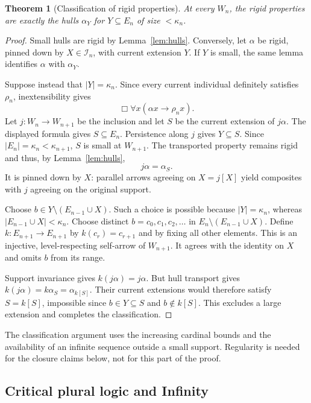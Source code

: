 \documentclass[11pt]{article}
\newtheorem{theorem}{Theorem}[section]
\theoremstyle{definition}
\numberwithin{equation}{section}
\begin{document}
\begin{theorem}[Classification of rigid properties]\label{thm:classification}
At every $W_n$, the rigid properties are exactly the hulls $\alpha_Y$ for $Y\subseteq E_n$ of size $<\kappa_n$.
\end{theorem}
\begin{proof}
Small hulls are rigid by Lemma~\ref{lem:hulls}. Conversely, let $\alpha$ be rigid, pinned down by $X\in\mathcal I_n$, with current extension $Y$. If $Y$ is small, the same lemma identifies $\alpha$ with $\alpha_Y$.

Suppose instead that $|Y|=\kappa_n$. Since every current individual definitely satisfies $\rho_n$, inextensibility gives
$$
\Box\forall x(\alpha x\rightarrow\rho_nx).
$$
Let $j:W_n\to W_{n+1}$ be the inclusion and let $S$ be the current extension of $j\alpha$. The displayed formula gives $S\subseteq E_n$. Persistence along $j$ gives $Y\subseteq S$. Since $|E_n|=\kappa_n<\kappa_{n+1}$, $S$ is small at $W_{n+1}$. The transported property remains rigid and thus, by Lemma~\ref{lem:hulls},
$$
j\alpha=\alpha_S.
$$
It is pinned down by $X$: parallel arrows agreeing on $X=j[X]$ yield composites with $j$ agreeing on the original support.

Choose $b\in Y\setminus(E_{n-1}\cup X)$. Such a choice is possible because $|Y|=\kappa_n$, whereas $|E_{n-1}\cup X|<\kappa_n$. Choose distinct $b=c_0,c_1,c_2,\ldots$ in $E_n\setminus(E_{n-1}\cup X)$. Define $k:E_{n+1}\to E_{n+1}$ by $k(c_r)=c_{r+1}$ and by fixing all other elements. This is an injective, level-respecting self-arrow of $W_{n+1}$. It agrees with the identity on $X$ and omits $b$ from its range.

Support invariance gives $k(j\alpha)=j\alpha$. But hull transport gives $k(j\alpha)=k\alpha_S=\alpha_{k[S]}$. Their current extensions would therefore satisfy $S=k[S]$, impossible since $b\in Y\subseteq S$ and $b\notin k[S]$. This excludes a large extension and completes the classification.
\end{proof}

The classification argument uses the increasing cardinal bounds and the availability of an infinite sequence outside a small support. Regularity is needed for the closure claims below, not for this part of the proof.

\subsection{Critical plural logic and Infinity}
\end{document}
